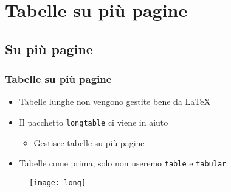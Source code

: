 \section{Tabelle su più pagine}
\subsection{Su più pagine}
\begin{frame}
 \frametitle{Tabelle su più pagine}

 \begin{itemize}
  \item Tabelle lunghe non vengono gestite bene da \LaTeX
  \item Il pacchetto \texttt{longtable} ci viene in aiuto
  \begin{itemize}
   \item Gestisce tabelle su più pagine
  \end{itemize}

  \item Tabelle come prima, solo non useremo \texttt{table} e \texttt{tabular}
 \end{itemize}
  
 \begin{figure}[H]
  \centering
  \texttt{[image: long]}
 \end{figure}

\end{frame}
